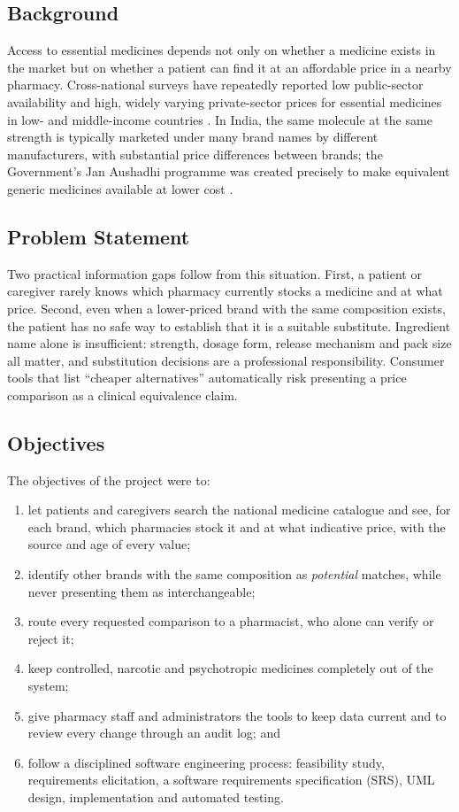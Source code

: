 \documentclass[11pt,a4paper]{article}
\begin{document}
\subsection{Background}
Access to essential medicines depends not only on whether a medicine exists in the market but on whether a patient can find it at an affordable price in a nearby pharmacy. Cross-national surveys have repeatedly reported low public-sector availability and high, widely varying private-sector prices for essential medicines in low- and middle-income countries \cite{cameron2009,who2008}. In India, the same molecule at the same strength is typically marketed under many brand names by different manufacturers, with substantial price differences between brands; the Government's Jan Aushadhi programme was created precisely to make equivalent generic medicines available at lower cost \cite{pmbjp}.

\subsection{Problem Statement}
Two practical information gaps follow from this situation. First, a patient or caregiver rarely knows which pharmacy currently stocks a medicine and at what price. Second, even when a lower-priced brand with the same composition exists, the patient has no safe way to establish that it is a suitable substitute. Ingredient name alone is insufficient: strength, dosage form, release mechanism and pack size all matter, and substitution decisions are a professional responsibility. Consumer tools that list ``cheaper alternatives'' automatically risk presenting a price comparison as a clinical equivalence claim.

\subsection{Objectives}
The objectives of the project were to:
\begin{enumerate}
\item let patients and caregivers search the national medicine catalogue and see, for each brand, which pharmacies stock it and at what indicative price, with the source and age of every value;
\item identify other brands with the same composition as \emph{potential} matches, while never presenting them as interchangeable;
\item route every requested comparison to a pharmacist, who alone can verify or reject it;
\item keep controlled, narcotic and psychotropic medicines completely out of the system;
\item give pharmacy staff and administrators the tools to keep data current and to review every change through an audit log; and
\item follow a disciplined software engineering process: feasibility study, requirements elicitation, a software requirements specification (SRS), UML design, implementation and automated testing.
\end{enumerate}
\end{document}
